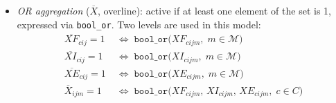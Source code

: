 \begin{convention}
\begin{itemize}
  \item \textit{OR aggregation} ($\overline{X}$, overline):
        active if at least one element of the set is 1,
        expressed via \texttt{bool\_or}. Two levels are used
        in this model:
        \begin{align*}
          \overline{XF}_{cij} = 1
            &\;\Leftrightarrow\;
            \texttt{bool\_or}\bigl(XF_{cijm},\;
            m\in\mathcal{M}\bigr) \\
          \overline{XI}_{cij} = 1
            &\;\Leftrightarrow\;
            \texttt{bool\_or}\bigl(XI_{cijm},\;
            m\in\mathcal{M}\bigr) \\
          \overline{XE}_{cij} = 1
            &\;\Leftrightarrow\;
            \texttt{bool\_or}\bigl(XE_{cijm},\;
            m\in\mathcal{M}\bigr) \\
          \overline{X}_{ijm} = 1
            &\;\Leftrightarrow\;
            \texttt{bool\_or}\bigl(
              XF_{cijm},\,XI_{cijm},\,XE_{cijm},\;
              c\in C\bigr)
        \end{align*}
\end{itemize}
\end{convention}

